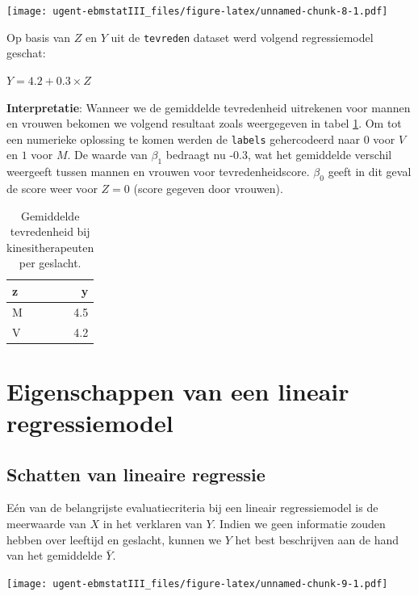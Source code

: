 \documentclass[
]{book}
\theoremstyle{definition}
\theoremstyle{definition}
\theoremstyle{definition}
\theoremstyle{definition}
\theoremstyle{remark}
\begin{document}
\texttt{[image: ugent-ebmstatIII\_files/figure-latex/unnamed-chunk-8-1.pdf]}

Op basis van \(Z\) en \(Y\) uit de \texttt{tevreden} dataset werd volgend regressiemodel geschat:

\(Y = 4.2 + 0.3 \times Z\)

\textbf{Interpretatie}: Wanneer we de gemiddelde tevredenheid uitrekenen voor mannen en vrouwen bekomen we volgend resultaat zoals weergegeven in tabel \ref{tab:tevredenmean}. Om tot een numerieke oplossing te komen werden de \texttt{labels} gehercodeerd naar \(0\) voor \(V\) en \(1\) voor \(M\). De waarde van \(\beta_1\) bedraagt nu -0.3, wat het gemiddelde verschil weergeeft tussen mannen en vrouwen voor tevredenheidscore. \(\beta_0\) geeft in dit geval de score weer voor \(Z=0\) (score gegeven door vrouwen).

\begin{table}

\caption{\label{tab:tevredenmean}Gemiddelde tevredenheid bij kinesitherapeuten per geslacht.}
\centering
\begin{tabular}[t]{lr}
\toprule
z & y\\
\midrule
M & 4.5\\
V & 4.2\\
\bottomrule
\end{tabular}
\end{table}

\hypertarget{eigenschappen-van-een-lineair-regressiemodel}{%
\section*{Eigenschappen van een lineair regressiemodel}\label{eigenschappen-van-een-lineair-regressiemodel}}


\hypertarget{schatten-van-lineaire-regressie}{%
\subsection*{Schatten van lineaire regressie}\label{schatten-van-lineaire-regressie}}


Eén van de belangrijste evaluatiecriteria bij een lineair regressiemodel is de meerwaarde van \(X\) in het verklaren van \(Y\). Indien we geen informatie zouden hebben over leeftijd en geslacht, kunnen we \(Y\) het best beschrijven aan de hand van het gemiddelde \(\bar{Y}\).

\texttt{[image: ugent-ebmstatIII\_files/figure-latex/unnamed-chunk-9-1.pdf]}
\end{document}
